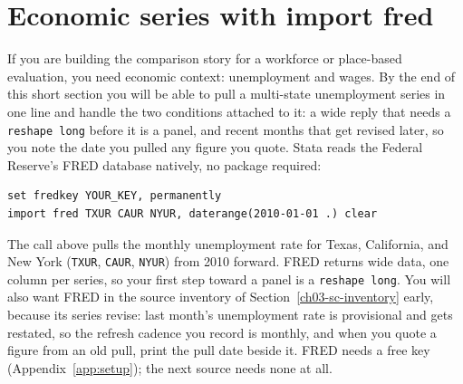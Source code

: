 \documentclass[
    a4paper,
    fontsize=10pt,
    twoside=true,
    numbers=noenddot,
]{kaobook}
\begin{document}
\section{Economic series with import fred}
If you are building the comparison story for a workforce or place-based evaluation, you need economic context: unemployment and wages. By the end of this short section you will be able to pull a multi-state unemployment series in one line and handle the two conditions attached to it: a wide reply that needs a \texttt{reshape long} before it is a panel, and recent months that get revised later, so you note the date you pulled any figure you quote. Stata reads the Federal Reserve's FRED database natively, no package required:
\par
{\footnotesize
\begin{verbatim}
set fredkey YOUR_KEY, permanently
import fred TXUR CAUR NYUR, daterange(2010-01-01 .) clear
\end{verbatim}
}
The call above pulls the monthly unemployment rate for Texas, California, and New York (\texttt{TXUR}, \texttt{CAUR}, \texttt{NYUR}) from 2010 forward. FRED returns wide data, one column per series, so your first step toward a panel is a \texttt{reshape long}. You will also want FRED in the source inventory of Section~\ref{ch03-sc-inventory} early, because its series revise: last month's unemployment rate is provisional and gets restated, so the refresh cadence you record is monthly, and when you quote a figure from an old pull, print the pull date beside it. FRED needs a free key (Appendix~\ref{app:setup}); the next source needs none at all.
\end{document}
